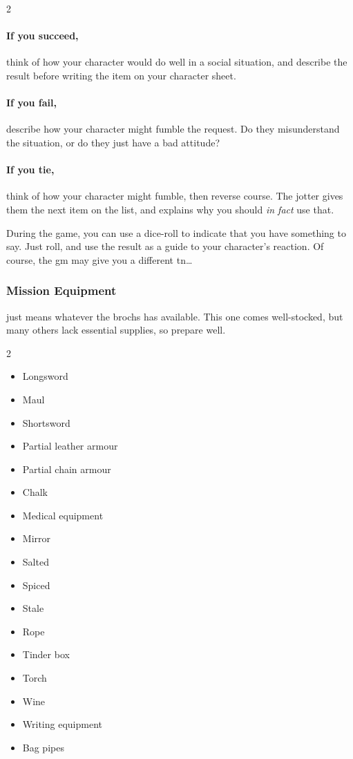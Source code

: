 \begin{multicols}{2}
\paragraph{If you succeed,}
think of how your character would do well in a social situation, and describe the result before writing the item on your character sheet.

\paragraph{If you fail,}
describe how your character might fumble the request.
Do they misunderstand the situation, or do they just have a bad attitude?

\paragraph{If you tie,}
think of how your character might fumble, then reverse course.
The jotter gives them the next item on the list, and explains why you should \emph{in fact} use that.

During the game, you can use a dice-roll to indicate that you have something to say.
Just roll, and use the result as a guide to your character's reaction.%
Of course, the \gls{gm} may give you a different \gls{tn}\ldots

\subsubsection{Mission Equipment}
\label{start_equipment}
just means whatever the \glspl{broch} has available.
This one comes well-stocked, but many others lack essential supplies, so prepare well.

\begin{multicols}{2}
\begin{itemize}
\raggedright
  \item
  Longsword
  \item
  Maul
  \item
  Shortsword
  \item
  Partial leather armour
  \item
  Partial chain armour
  \item
  Chalk
  \item
  Medical equipment
  \item
  Mirror
  \item
  Salted \rations
  \item
  Spiced \rations
  \item
  Stale \rations
  \item
  Rope
  \item
  Tinder box
  \item
  Torch
  \item
  Wine
  \item
  Writing equipment
  \item
  Bag pipes
\end{itemize}


\end{multicols}
\end{multicols}
